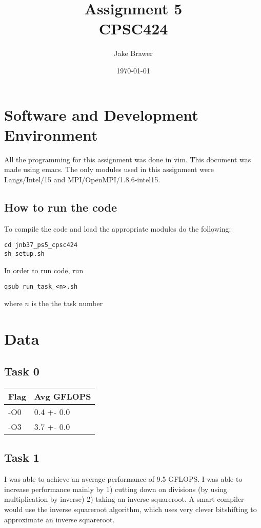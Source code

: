 \documentclass[11pt]{article}
\author{Jake Brawer}
\date{\today}
\title{Assignment 5\\\medskip
\large CPSC424}
\begin{document}
\maketitle


\section{Software and Development Environment}
\label{sec:org1b550e2}

All the programming for this assignment was done in vim. This document was made using emacs. The only modules used in this assignment were Langs/Intel/15 and MPI/OpenMPI/1.8.6-intel15.

\subsection{How to run the code}
\label{sec:orgba838ff}

To compile the code and load the appropriate modules do the following:
\begin{verbatim}
cd jnb37_ps5_cpsc424
sh setup.sh
\end{verbatim}

In order to run code, run
\begin{verbatim}
qsub run_task_<n>.sh
\end{verbatim}
where \(n\) is the the task number
\section{Data}
\label{sec:org9db8ad4}

\subsection{Task 0}
\label{sec:org0809da9}

\begin{center}
\begin{tabular}{ll}
Flag & Avg GFLOPS\\
\hline
-O0 & 0.4 +- 0.0\\
-O3 & 3.7 +- 0.0\\
\end{tabular}
\end{center}

\subsection{Task 1}
\label{sec:orgd89275e}

I was able to achieve an average performance of 9.5 GFLOPS. I was able to increase performance mainly by 1) cutting down on divisions (by using multiplication by inverse) 2) taking an inverse squareroot. A smart compiler would use the inverse squareroot algorithm, which uses very clever bitshifting to approximate an inverse squareroot.
\end{document}
